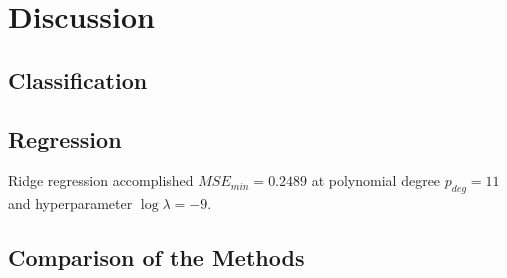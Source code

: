 \section{Discussion}
    \subsection{Classification}
             
            
        
            
    \subsection{Regression}
        Ridge regression accomplished $MSE_{min}=0.2489$ at polynomial degree $p_{deg}=11$ and hyperparameter $\log\lambda=-9$.
             
            
     
    \subsection{Comparison of the Methods}
        
